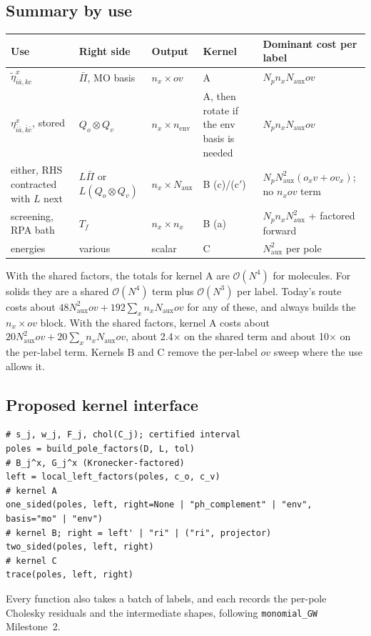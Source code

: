 \documentclass[11pt,a4paper]{article}
\newcommand{\code}[1]{\texttt{\small #1}}
\newcommand{\Naux}{N_{\mathrm{aux}}}
\newcommand{\Np}{N_{p}}
\newcommand{\ov}{ov}
\begin{document}
\subsection{Summary by use}

\begin{center}
\small
\begin{tabularx}{\textwidth}{@{}>{\raggedright\arraybackslash}p{3.2cm}>{\raggedright\arraybackslash}p{2.6cm}>{\raggedright\arraybackslash}p{1.6cm}>{\raggedright\arraybackslash}p{1.9cm}L@{}}
\toprule
Use & Right side & Output & Kernel & Dominant cost per label \\
\midrule
$\tilde\eta^x_{\bar i\bar a,kc}$ & $\bar\Pi$, MO basis & $n_x\times\ov$ & A & $\Np n_x\Naux\ov$ \\
$\eta^x_{\bar i\bar a,\bar k\bar c}$, stored & $Q_o\otimes Q_v$ & $n_x\times n_{\mathrm{env}}$
  & A, then rotate if the env basis is needed & $\Np n_x\Naux\ov$ \\
either, RHS contracted with $L$ next & $L\bar\Pi$ or $L(Q_o\otimes Q_v)$ & $n_x\times\Naux$ & B (c)/(c$'$)
  & $\Np\Naux^2(o_xv+ov_x)$; no $n_x\ov$ term \\
screening, RPA bath & $T_f$ & $n_x\times n_x$ & B (a) & $\Np n_x\Naux^2$ + factored forward \\
energies & various & scalar & C & $\Naux^2$ per pole \\
\bottomrule
\end{tabularx}
\end{center}

With the shared factors, the totals for kernel A are $\mathcal{O}(N^4)$ for molecules. For
solids they are a shared $\mathcal{O}(N^4)$ term plus $\mathcal{O}(N^3)$ per label. Today's route
costs about $48\Naux^2\ov + 192\sum_xn_x\Naux\ov$ for any of these, and always builds the
$n_x\times\ov$ block. With the shared factors, kernel A costs about
$20\Naux^2\ov + 20\sum_xn_x\Naux\ov$, about 2.4$\times$ on the shared term and about
10$\times$ on the per-label term. Kernels B and C remove the per-label $\ov$ sweep where the
use allows it.

\subsection{Proposed kernel interface}

\begin{small}
\begin{verbatim}
# s_j, w_j, F_j, chol(C_j); certified interval
poles = build_pole_factors(D, L, tol)
# B_j^x, G_j^x (Kronecker-factored)
left = local_left_factors(poles, c_o, c_v)
# kernel A
one_sided(poles, left, right=None | "ph_complement" | "env", basis="mo" | "env")
# kernel B; right = left' | "ri" | ("ri", projector)
two_sided(poles, left, right)
# kernel C
trace(poles, left, right)
\end{verbatim}
\end{small}
Every function also takes a batch of labels, and each records the per-pole Cholesky residuals
and the intermediate shapes, following \code{monomial\_GW} Milestone~2.
\end{document}
